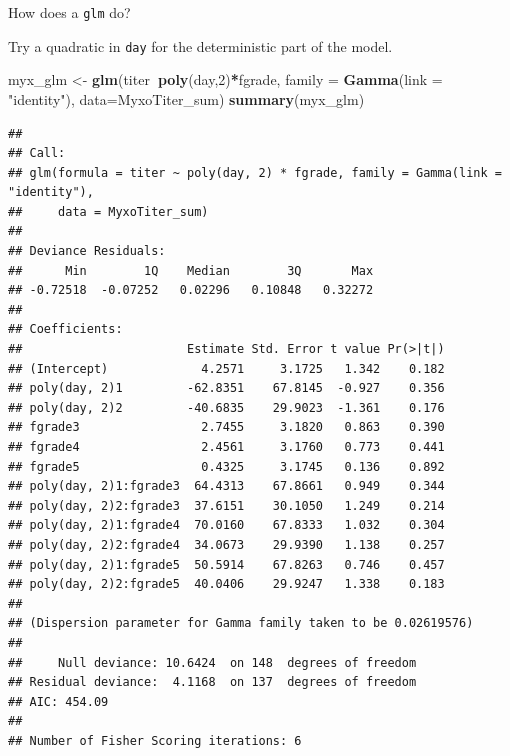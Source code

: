 \documentclass[
  ignorenonframetext,
]{beamer}
\newenvironment{Shaded}{\begin{snugshade}}{\end{snugshade}}
\newcommand{\DataTypeTok}[1]{\textcolor[rgb]{0.13,0.29,0.53}{#1}}
\newcommand{\DecValTok}[1]{\textcolor[rgb]{0.00,0.00,0.81}{#1}}
\newcommand{\KeywordTok}[1]{\textcolor[rgb]{0.13,0.29,0.53}{\textbf{#1}}}
\newcommand{\NormalTok}[1]{#1}
\newcommand{\OperatorTok}[1]{\textcolor[rgb]{0.81,0.36,0.00}{\textbf{#1}}}
\newcommand{\StringTok}[1]{\textcolor[rgb]{0.31,0.60,0.02}{#1}}
\begin{document}
\begin{frame}[fragile]{How does a \texttt{glm} do?}
\protect\hypertarget{how-does-a-glm-do}{}

Try a quadratic in \texttt{day} for the deterministic part of the model.
\tiny

\begin{Shaded}
\begin{Highlighting}[]
\NormalTok{myx_glm <-}\StringTok{ }\KeywordTok{glm}\NormalTok{(titer}\OperatorTok{~}\KeywordTok{poly}\NormalTok{(day,}\DecValTok{2}\NormalTok{)}\OperatorTok{*}\NormalTok{fgrade, }
               \DataTypeTok{family =} \KeywordTok{Gamma}\NormalTok{(}\DataTypeTok{link =} \StringTok{"identity"}\NormalTok{), }\DataTypeTok{data=}\NormalTok{MyxoTiter_sum)}
\KeywordTok{summary}\NormalTok{(myx_glm)}
\end{Highlighting}
\end{Shaded}

\begin{verbatim}
## 
## Call:
## glm(formula = titer ~ poly(day, 2) * fgrade, family = Gamma(link = "identity"), 
##     data = MyxoTiter_sum)
## 
## Deviance Residuals: 
##      Min        1Q    Median        3Q       Max  
## -0.72518  -0.07252   0.02296   0.10848   0.32272  
## 
## Coefficients:
##                       Estimate Std. Error t value Pr(>|t|)
## (Intercept)             4.2571     3.1725   1.342    0.182
## poly(day, 2)1         -62.8351    67.8145  -0.927    0.356
## poly(day, 2)2         -40.6835    29.9023  -1.361    0.176
## fgrade3                 2.7455     3.1820   0.863    0.390
## fgrade4                 2.4561     3.1760   0.773    0.441
## fgrade5                 0.4325     3.1745   0.136    0.892
## poly(day, 2)1:fgrade3  64.4313    67.8661   0.949    0.344
## poly(day, 2)2:fgrade3  37.6151    30.1050   1.249    0.214
## poly(day, 2)1:fgrade4  70.0160    67.8333   1.032    0.304
## poly(day, 2)2:fgrade4  34.0673    29.9390   1.138    0.257
## poly(day, 2)1:fgrade5  50.5914    67.8263   0.746    0.457
## poly(day, 2)2:fgrade5  40.0406    29.9247   1.338    0.183
## 
## (Dispersion parameter for Gamma family taken to be 0.02619576)
## 
##     Null deviance: 10.6424  on 148  degrees of freedom
## Residual deviance:  4.1168  on 137  degrees of freedom
## AIC: 454.09
## 
## Number of Fisher Scoring iterations: 6
\end{verbatim}

\end{frame}
\end{document}
